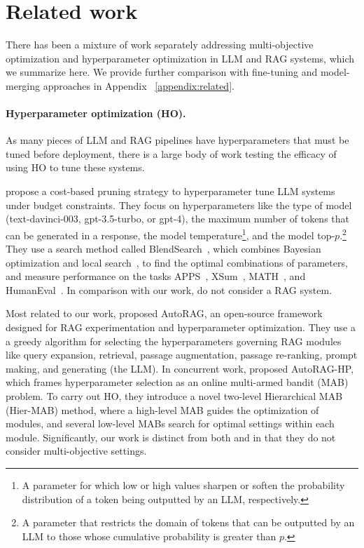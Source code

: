 \section{Related work}
\label{sec:related}
There has been a mixture of work separately addressing multi-objective optimization and hyperparameter optimization in LLM and RAG systems, which we summarize here. We provide further comparison with fine-tuning and model-merging approaches in Appendix ~\ref{appendix:related}.

\paragraph{Hyperparameter optimization (HO).} As many pieces of LLM and RAG pipelines have hyperparameters that must be tuned before deployment, there is a large body of work testing the efficacy of using HO to tune these systems. %

\citet{wang2023cost} propose a cost-based pruning strategy to hyperparameter tune LLM systems under budget constraints. They focus on hyperparameters like the type of model (\eg text-davinci-003, gpt-3.5-turbo, or gpt-4), the maximum number of tokens that can be generated in a response, the model temperature\footnote{A parameter for which low or high values sharpen or soften the probability distribution of a token being outputted by an LLM, respectively.}, and the model top-$p$.\footnote{A parameter that restricts the domain of tokens that can be outputted by an LLM to those whose cumulative probability is greater than $p$.} They use a search method called BlendSearch~\citep{wang2021economic}, which combines Bayesian optimization and local search~\citep{wu2021frugal}, to find the optimal combinations of parameters, and measure performance on the tasks APPS~\citep{hendrycks2021measuring}, XSum~\citep{narayan2018don}, MATH~\citep{hendrycks2021measuring}, and HumanEval~\cite{chen2021evaluating}. In comparison with our work, \citet{wang2023cost} do not consider a RAG system.

Most related to our work, \citet{kim2024autorag} proposed AutoRAG, an open-source framework designed for RAG experimentation and hyperparameter optimization. They use a a greedy algorithm for selecting the hyperparameters governing RAG modules like query expansion, retrieval, passage augmentation, passage re-ranking, prompt making, and generating (the LLM). In concurrent work, \citet{fu2024autorag} proposed AutoRAG-HP, which frames hyperparameter selection as an online multi-armed bandit (MAB) problem. To carry out HO, they introduce a novel two-level Hierarchical MAB (Hier-MAB) method, where a high-level MAB guides the optimization of modules, and several low-level MABs search for optimal settings within each module. Significantly, our work is distinct from both \citet{kim2024autorag} and \citet{fu2024autorag} in that they do not consider multi-objective settings.


